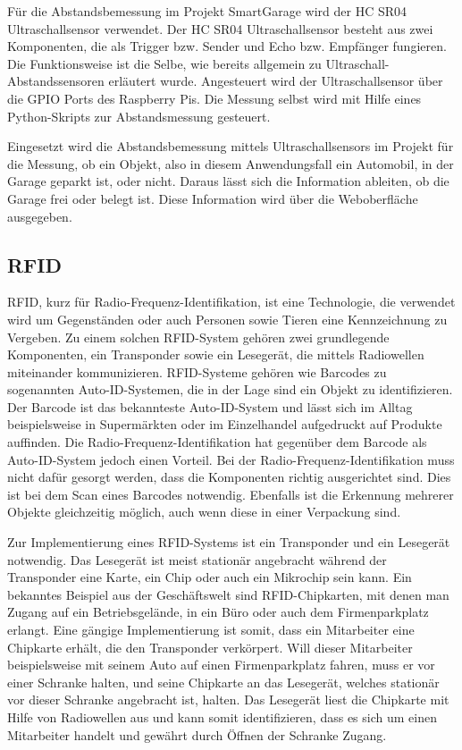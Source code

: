 Für die Abstandsbemessung im Projekt SmartGarage wird der HC SR04 Ultraschallsensor verwendet. Der HC SR04 Ultraschallsensor besteht aus zwei Komponenten, die als Trigger bzw. Sender und Echo bzw. Empfänger fungieren. Die Funktionsweise ist die Selbe, wie bereits allgemein zu Ultraschall-Abstandssensoren erläutert wurde. Angesteuert wird der Ultraschallsensor über die GPIO Ports des Raspberry Pis. Die Messung selbst wird mit Hilfe eines Python-Skripts zur Abstandsmessung gesteuert. 

Eingesetzt wird die Abstandsbemessung mittels Ultraschallsensors im Projekt für die Messung, ob ein Objekt, also in diesem Anwendungsfall ein Automobil, in der Garage geparkt ist, oder nicht. Daraus lässt sich die Information ableiten, ob die Garage frei oder belegt ist. Diese Information wird über die Weboberfläche ausgegeben.

\subsection{RFID}
RFID, kurz für Radio-Frequenz-Identifikation, ist eine Technologie, die verwendet wird um Gegenständen oder auch Personen sowie Tieren eine Kennzeichnung zu Vergeben. Zu einem solchen RFID-System gehören zwei grundlegende Komponenten, ein Transponder sowie ein Lesegerät, die mittels Radiowellen miteinander kommunizieren. RFID-Systeme gehören wie Barcodes zu sogenannten Auto-ID-Systemen, die in der Lage sind ein Objekt zu identifizieren. Der Barcode ist das bekannteste Auto-ID-System und lässt sich im Alltag beispielsweise in Supermärkten oder im Einzelhandel aufgedruckt auf Produkte auffinden. Die Radio-Frequenz-Identifikation hat gegenüber dem Barcode als Auto-ID-System jedoch einen Vorteil. Bei der Radio-Frequenz-Identifikation muss nicht dafür gesorgt werden, dass die Komponenten richtig ausgerichtet sind. Dies ist bei dem Scan eines Barcodes notwendig. Ebenfalls ist die Erkennung mehrerer Objekte gleichzeitig möglich, auch wenn diese in einer Verpackung sind.\autocite[Vgl.][S. 11]{rfid2}

Zur Implementierung eines RFID-Systems ist ein Transponder und ein Lesegerät notwendig. Das Lesegerät ist meist stationär angebracht während der Transponder eine Karte, ein Chip oder auch ein Mikrochip sein kann.\autocite[Vgl.][S. 33]{rfid} Ein bekanntes Beispiel aus der Geschäftswelt sind RFID-Chipkarten, mit denen man Zugang auf ein Betriebsgelände, in ein Büro oder auch dem Firmenparkplatz erlangt. Eine gängige Implementierung ist somit, dass ein Mitarbeiter eine Chipkarte erhält, die den Transponder verkörpert. Will dieser Mitarbeiter beispielsweise mit seinem Auto auf einen Firmenparkplatz fahren, muss er vor einer Schranke halten, und seine Chipkarte an das Lesegerät, welches stationär vor dieser Schranke angebracht ist, halten. Das Lesegerät liest die Chipkarte mit Hilfe von Radiowellen aus und kann somit identifizieren, dass es sich um einen Mitarbeiter handelt und gewährt durch Öffnen der Schranke Zugang.

